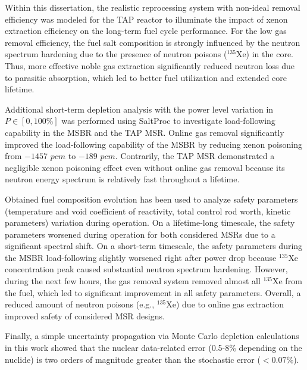 Within this dissertation, the realistic reprocessing system with non-ideal 
removal efficiency was modeled for the TAP reactor to illuminate the impact of 
xenon extraction efficiency on the long-term fuel cycle performance. For the 
low gas removal efficiency, the fuel salt composition is strongly influenced 
by the neutron spectrum hardening due to the presence of neutron poisons 
($^{135}$Xe) in the core. Thus, more effective noble gas extraction 
significantly reduced neutron loss due to parasitic absorption, which led to 
better fuel utilization and extended core lifetime. 

Additional short-term depletion analysis with the power level variation in 
$P\in[0,100\%]$ was performed using SaltProc to investigate load-following 
capability in the \gls{MSBR} and the \gls{TAP} \gls{MSR}. Online gas removal 
significantly improved the load-following capability of the \gls{MSBR} by 
reducing xenon poisoning from $-1457$ $pcm$ to $-189$ $pcm$. Contrarily, the 
\gls{TAP} \gls{MSR} demonstrated a negligible xenon poisoning effect even 
without online gas removal because its neutron energy spectrum is relatively 
fast throughout a lifetime.

Obtained fuel composition evolution has been used to analyze safety parameters 
(temperature and void coefficient of reactivity, total control rod worth, 
kinetic parameters) variation during operation. On a lifetime-long timescale, 
the safety parameters worsened during operation for both considered 
\glspl{MSR} due to a significant spectral shift. On a short-term timescale, 
the safety parameters during the \gls{MSBR} load-following slightly worsened 
right after power drop because $^{135}$Xe concentration peak caused 
substantial neutron spectrum hardening. However, during the next few hours, 
the gas removal system removed almost all $^{135}$Xe from the fuel, which led 
to significant improvement in all safety parameters. Overall, a reduced amount 
of neutron poisons (e.g., $^{135}$Xe) due to online gas extraction improved 
safety of considered \gls{MSR} designs.

Finally, a simple uncertainty propagation via Monte Carlo depletion 
calculations in this work showed that the nuclear data-related error (0.5-8\% 
depending on the nuclide) is two orders of magnitude greater than the 
stochastic error ($<0.07$\%).